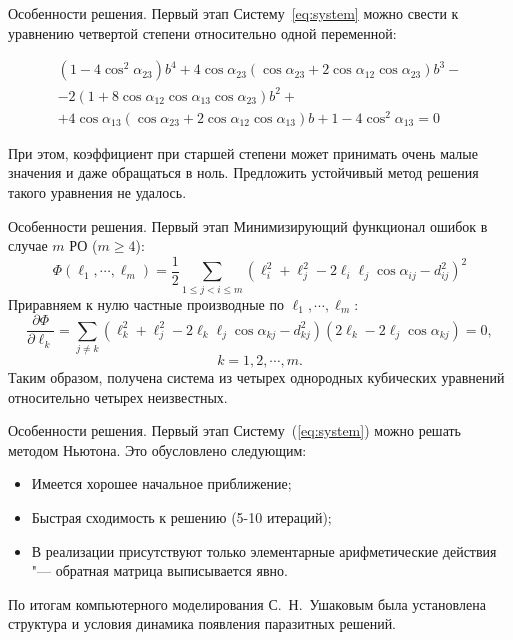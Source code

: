 \documentclass[russian,hyperref={unicode}]{beamer}
\begin{document}
  \begin{frame}{Особенности решения. Первый этап}
    Систему~\eqref{eq:system} можно свести к уравнению четвертой степени относительно одной переменной:

    \begin{multline*}
      \left(1-4 \cos^2 \alpha_{23}\right) b^4 + 4 \cos \alpha_{23} \left(\cos \alpha_{23} + 2 \cos \alpha_{12} \cos \alpha_{23} \right) b^3 - \\
      - 2 \left(1 + 8 \cos \alpha_{12} \cos \alpha_{13} \cos \alpha_{23}\right) b^2 + \\
      + 4 \cos \alpha_{13} \left(\cos \alpha_{23} + 2 \cos \alpha_{12} \cos \alpha_{13}\right) b + 1-4 \cos^2 \alpha_{13} = 0
    \end{multline*}

    При этом, коэффициент при старшей степени может принимать очень малые значения и даже обращаться в ноль. Предложить устойчивый метод решения такого уравнения не удалось.
  \end{frame}

  \begin{frame}{Особенности решения. Первый этап}
    Минимизирующий функционал ошибок в случае $m$ РО ($m \ge 4$):
    \begin{equation*}
      \Phi\left(\ell_1, \cdots, \ell_m \right) = \frac{1}{2}\sum_{1 \leq j < i \leq m} \left(\ell_i^2 + \ell_j^2 - 2 \ell_i \ell_j \cos\alpha_{ij} - d_{ij}^2\right)^2
    \end{equation*}
    Приравняем к нулю частные производные по $\ell_1, \cdots, \ell_m$:
    \begin{equation*}
      \frac{\partial\Phi}{\partial\ell_k} = \sum_{j \ne k} \left(\ell_k^2 + \ell_j^2 - 2 \ell_k \ell_j \cos\alpha_{kj} - d_{kj}^2\right)\left(2 \ell_k - 2 \ell_j \cos\alpha_{kj}\right) = 0,
    \end{equation*}
    \begin{equation*}
      k = 1, 2, \cdots, m.
    \end{equation*}
    Таким образом, получена система из четырех однородных кубических уравнений относительно четырех неизвестных.
  \end{frame}

  \begin{frame}{Особенности решения. Первый этап}
    Систему~(\ref{eq:system}) можно решать методом Ньютона. Это обусловлено следующим:
    \begin{itemize}
      \item Имеется хорошее начальное приближение;
      \item Быстрая сходимость к решению (5-10 итераций);
      \item В реализации присутствуют только элементарные арифметические действия "--- обратная матрица выписывается явно.
    \end{itemize}

    По итогам компьютерного моделирования С.~Н.~Ушаковым была установлена структура и условия динамика появления паразитных решений.
  \end{frame}
\end{document}
